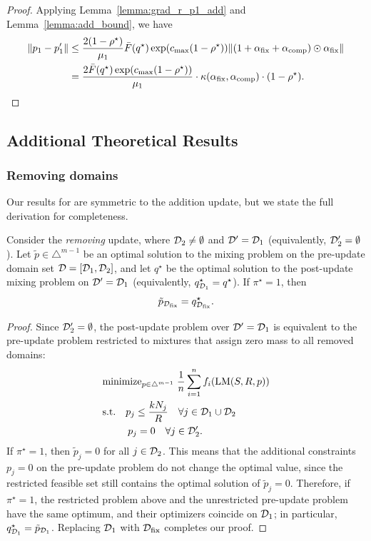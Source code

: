 \begin{proof}
    Applying Lemma~\ref{lemma:grad_r_p1_add} and Lemma~\ref{lemma:add_bound}, we have
    \begin{align*}
        \| p_1 - p_1' \| &\le \frac{2(1 - \rho^\star)}{\mu_1} \bar{F}(q^\star) \exp( c_{\max}(1 - \rho^\star)) \|(1 + \alpha_{\text{fix}} + \alpha_{\text{comp}}) \odot \alpha_{\text{fix}} \| \\
        &= \frac{2\bar{F}(q^\star) \exp( c_{\max}(1 - \rho^\star))}{\mu_1}   \cdot \kappa(\alpha_{\text{fix}}, \alpha_{\text{comp}}) \cdot (1 - \rho^\star).
    \end{align*}
\end{proof}

\subsection{Additional Theoretical Results}

\subsubsection{Removing domains}

Our results for are symmetric to the addition update, but we state the full derivation for completeness.

\begin{lemma}[When $\tilde{p}_{\Dfix} = q^\star_{\Dfix}$ for removing]\label{lem:rem_exactness}
Consider the \emph{removing} update, where $\mathcal{D}_2\neq\emptyset$ and $\mathcal{D}'=\mathcal{D}_1$ (equivalently, $\mathcal{D}_2'=\emptyset$).
Let $\tilde p\in\triangle^{m-1}$ be an optimal solution to the mixing problem on the pre-update domain set $\mathcal{D}=[\mathcal{D}_1,\mathcal{D}_2]$, and let $q^\star$ be the optimal solution to the post-update mixing problem on $\mathcal{D}'=\mathcal{D}_1$ (equivalently, $q^\star_{\mathcal{D}_1}=q^\star$).
If $\pi^\star=1$, then
\[
\tilde p_{\mathcal{D}_{\text{fix}}} = q^\star_{\mathcal{D}_{\text{fix}}}.
\]
\end{lemma}

\begin{proof}
Since $\mathcal{D}_2'=\emptyset$, the post-update problem over $\mathcal{D}'=\mathcal{D}_1$ is equivalent to the pre-update problem restricted to mixtures that assign zero mass to all removed domains:
\begin{align*}
    &\text{minimize}_{p\in\triangle^{m-1}} \; \frac{1}{n} \sum_{i = 1}^n f_i(\text{LM}(S, R, p)) \\
    &\text{s.t.}\quad p_j \le \frac{kN_j}{R}\quad \forall j\in\mathcal{D}_1\cup\mathcal{D}_2 \\
    &\qquad\;\; p_j = 0 \quad \forall j\in\mathcal{D}_2'.
\end{align*}
If $\pi^\star=1$, then $\tilde p_j=0$ for all $j\in\mathcal{D}_2$. This means that the additional constraints $p_j=0$ on the pre-update problem do not change the optimal value, since the restricted feasible set still contains the optimal solution of $\tilde p_j = 0$. Therefore, if $\pi^\star = 1$, the restricted problem above and the unrestricted pre-update problem have the same optimum, and their optimizers coincide on $\mathcal{D}_1$; in particular, $q^\star_{\mathcal{D}_1}=\tilde p_{\mathcal{D}_1}$. Replacing $\mathcal{D}_1$ with $\mathcal{D}_{\text{fix}}$ completes our proof.
\end{proof}

